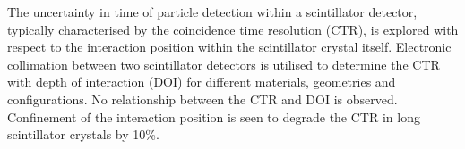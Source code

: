 The uncertainty in time of particle detection within a scintillator detector, typically characterised by the coincidence time resolution (CTR), is explored with respect to the interaction position within the scintillator crystal itself. Electronic collimation between two scintillator detectors is utilised to determine the CTR with depth of interaction (DOI) for different materials, geometries and configurations. No relationship between the CTR and DOI is observed. Confinement of the interaction position is seen to degrade the CTR in long scintillator crystals by 10\%.